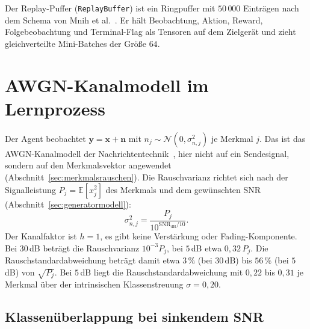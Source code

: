 Der Replay-Puffer (\texttt{ReplayBuffer}) ist ein Ringpuffer mit $50\,000$ Einträgen nach dem Schema von Mnih et al.~\autocite{mnihHumanlevelControlDeep2015}. Er hält Beobachtung, Aktion, Reward, Folgebeobachtung und Terminal-Flag als Tensoren auf dem Zielgerät und zieht gleichverteilte Mini-Batches der Größe $64$.

\section{AWGN-Kanalmodell im Lernprozess}
\label{sec:awgn_kanal}

Der Agent beobachtet $\mathbf{y}=\mathbf{x}+\mathbf{n}$ mit $n_j\sim\mathcal{N}(0,\sigma_{n,j}^2)$ je Merkmal $j$. Das ist das AWGN-Kanalmodell der Nachrichtentechnik~\autocite{proakisDigitalCommunications2008}, hier nicht auf ein Sendesignal, sondern auf den Merkmalsvektor angewendet (Abschnitt~\ref{sec:merkmalsrauschen}). Die Rauschvarianz richtet sich nach der Signalleistung $P_j=\mathbb{E}[x_j^2]$ des Merkmals und dem gewünschten SNR (Abschnitt~\ref{sec:generatormodell}):
\begin{equation}
	\sigma_{n,j}^2=\frac{P_j}{10^{\mathrm{SNR_{dB}}/10}}.
\end{equation}
Der Kanalfaktor ist $h=1$, es gibt keine Verstärkung oder Fading-Komponente. Bei $30$\,dB beträgt die Rauschvarianz $10^{-3}P_j$, bei $5$\,dB etwa $0{,}32\,P_j$. Die Rauschstandardabweichung beträgt damit etwa $3\,\%$ (bei $30$\,dB) bis $56\,\%$ (bei $5$\,dB) von $\sqrt{P_j}$. Bei $5$\,dB liegt die Rauschstandardabweichung mit $0{,}22$ bis $0{,}31$ je Merkmal über der intrinsischen Klassenstreuung $\sigma=0{,}20$.

\subsection{Klassenüberlappung bei sinkendem SNR}
\label{sec:klassenueberlappung}

